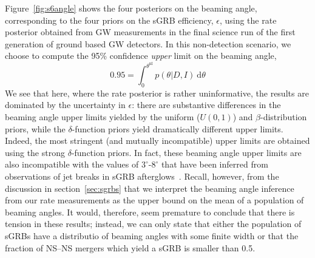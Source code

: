 \documentclass[twocolumn,nofootinbib]{revtex4-1}
\newcommand{\diff}{{\mathrm d}}
\newcommand{\BNS}{\ac{NS}--\ac{NS}\xspace}
\begin{document}
Figure~\ref{fig:s6angle} shows the four posteriors on the beaming angle, corresponding to the four priors on the \ac{sGRB} efficiency, $\epsilon$, using the rate posterior obtained from \ac{GW} measurements in the final science run of the first generation of ground based \ac{GW} detectors.
In this non-detection scenario, we choose to compute the 95\% confidence \emph{upper} limit on the beaming angle,
\begin{equation}
    \label{eq:beaming_upper_limit}
    0.95 = \int_0^{\theta^{\mathrm{ul}}} p(\theta|D,I)~\diff \theta
\end{equation}
%
We see that here, where the rate posterior is rather uninformative, the results are dominated by the uncertainty in $\epsilon$: there are substantive differences in the beaming angle upper limits yielded by the uniform ($U(0,1)$) and $\beta$-distribution priors, while the $\delta$-function priors yield dramatically different upper limits.
Indeed, the most stringent (and mutually incompatible) upper limits are obtained using the strong $\delta$-function priors.
In fact, these beaming angle upper limits are also incompatible with the values of $3^{\circ}\mbox{-}8^{\circ}$ that have been inferred from observations of jet breaks in \ac{sGRB} afterglows~\cite{Fong:2013lba,2006MNRAS.367L..42P, 2012A&A...538L...7N}.
Recall, however, from the discussion in section~\ref{sec:sgrbs} that we interpret the beaming angle inference from our rate measurements as the upper bound on the mean of a population of beaming angles.
It would, therefore, seem premature to conclude that there is tension in these results; instead, we can only state that either the population of \acp{sGRB} have a distributio of beaming angles with some finite width or that the fraction of \BNS mergers which yield a \ac{sGRB} is smaller than 0.5.
\end{document}
